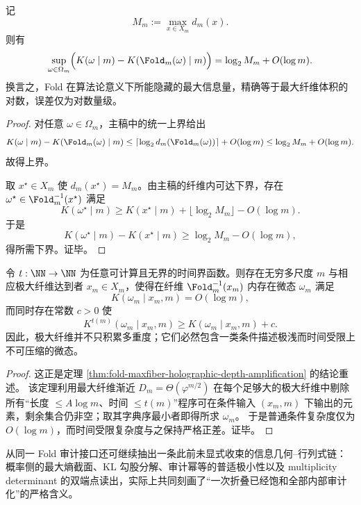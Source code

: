 \begin{theorem}\label{thm:conclusion-max-algorithmic-uplift-maxfiber-log}
记
\[
M_m:=\max_{x\in X_m} d_m(x).
\]
则有
\[
\sup_{\omega\in\Omega_m}
\Bigl(
K(\omega\mid m)-K(\Fold_m(\omega)\mid m)
\Bigr)
=
\log_2 M_m + O(\log m).
\]
换言之，Fold 在算法论意义下所能隐藏的最大信息量，精确等于最大纤维体积的对数，误差仅为对数量级。
\end{theorem}
\begin{proof}
对任意 \(\omega\in\Omega_m\)，主稿中的统一上界给出
\[
K(\omega\mid m)-K(\Fold_m(\omega)\mid m)
\le
\lceil \log_2 d_m(\Fold_m(\omega))\rceil + O(\log m)
\le
\log_2 M_m + O(\log m).
\]
故得上界。

取 \(x^\star\in X_m\) 使 \(d_m(x^\star)=M_m\)。由主稿的纤维内可达下界，存在 \(\omega^\star\in \Fold_m^{-1}(x^\star)\) 满足
\[
K(\omega^\star\mid m)\ge K(x^\star\mid m)+\lfloor \log_2 M_m\rfloor - O(\log m).
\]
于是
\[
K(\omega^\star\mid m)-K(x^\star\mid m)\ge \log_2 M_m - O(\log m),
\]
得所需下界。证毕。
\end{proof}

\begin{theorem}\label{thm:conclusion-maxfiber-shallow-description-deep-computation-gap}
令 \(t:\NN\to\NN\) 为任意可计算且无界的时间界函数。则存在无穷多尺度 \(m\) 与相应极大纤维达到者 \(x_m\in X_m\)，使得在纤维 \(\Fold_m^{-1}(x_m)\) 内存在微态 \(\omega_m\) 满足
\[
K(\omega_m\mid x_m,m)=O(\log m),
\]
而同时存在常数 \(c>0\) 使
\[
K^{t(m)}(\omega_m\mid x_m,m)\ge K(\omega_m\mid x_m,m)+c.
\]
因此，极大纤维并不只积累多重度；它们必然包含一类条件描述极浅而时间受限上不可压缩的微态。
\end{theorem}

\begin{proof}
这正是定理 \ref{thm:fold-maxfiber-holographic-depth-amplification} 的结论重述。
该定理利用最大纤维渐近 \(D_m=\Theta(\varphi^{m/2})\) 在每个足够大的极大纤维中剔除所有“长度 \(\le A\log m\)、时间 \(\le t(m)\)”程序可在条件输入 \((x_m,m)\) 下输出的元素，剩余集合仍非空；取其字典序最小者即得所求 \(\omega_m\)。
于是普通条件复杂度仅为 \(O(\log m)\)，而时间受限复杂度与之保持严格正差。证毕。
\end{proof}

从同一 Fold 审计接口还可继续抽出一条此前未显式收束的信息几何--行列式链：概率侧的最大熵截面、KL 勾股分解、审计幂等的普适极小性以及 multiplicity determinant 的双端点读出，实际上共同刻画了“一次折叠已经饱和全部内部审计化”的严格含义。


